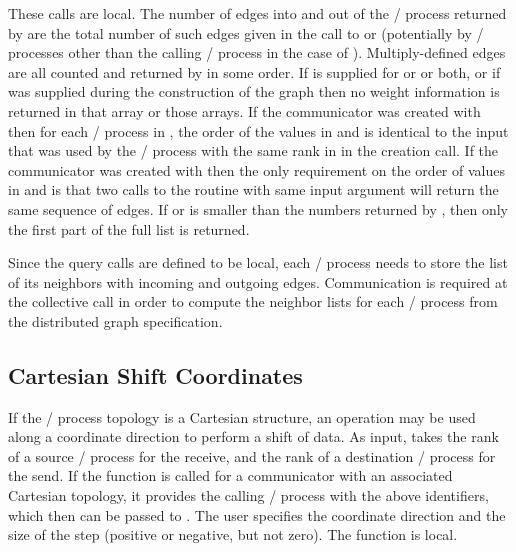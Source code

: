 These calls are local. The number of edges into and out of the \MPI/ process
returned by  are the total
number of such edges given in the call to
 or
 (potentially by \MPI/ processes other
than the calling \MPI/ process in the case of
). Multiply-defined edges are all
counted and returned by  in some
order. If  is supplied for
 or  or both, or if
 was supplied during the construction of the
graph then no weight information is returned in that array or those
arrays. 
If the communicator was created with 
then for each \MPI/ process in , the order of the values in
 and  is identical to the input
that was used by the \MPI/ process with the same rank in 
in the creation call.
If the communicator was created with 
then the 
only requirement on the order of values in
 and  is that two calls to the
routine with same input argument  will return the same
sequence of edges. If  or  is
smaller than the numbers returned by
, then only the first part
of the full list is returned. 

\begin{implementors}
Since the query calls are defined to be local, each \MPI/ process needs to
store the list of its neighbors with incoming and outgoing
edges. Communication is required at the collective
 call in order to compute the neighbor
lists for each \MPI/ process from the distributed graph specification.
\end{implementors}

\subsection{Cartesian Shift Coordinates}
\label{subsec:topol-shift}

If the \MPI/ process topology is a Cartesian structure, an
operation may be used along a coordinate direction to perform a shift
of data.  As input,  takes the rank of a source \MPI/ process
for the receive, and the rank of a destination \MPI/ process for the send.  If the
function  is called for a communicator with an
associated Cartesian topology, it
provides the calling \MPI/ process with the above identifiers, which then can be
passed to . The user specifies the coordinate direction
and the size of the step (positive or negative, but not zero).
The function is local.


